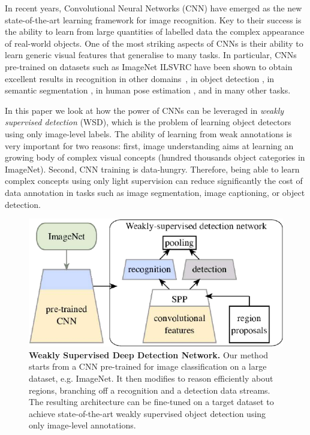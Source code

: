 In recent years, Convolutional Neural Networks (CNN) \cite{Lecun89} have emerged as the new state-of-the-art learning framework for image recognition. Key to their success is the ability to learn from large quantities of labelled data the complex appearance of real-world objects. One of the most striking aspects of CNNs is their ability to learn generic visual features that generalise to many tasks. In particular, CNNs pre-trained on datasets such as ImageNet ILSVRC have been shown to obtain excellent results in recognition in other domains~\cite{Donahue13}, in object detection \cite{Girshick14}, in semantic segmentation \cite{Hariharan14}, in human pose estimation \cite{Toshev13}, and in many other tasks.

In this paper we look at how the power of CNNs can be leveraged in  \emph{weakly supervised detection} (WSD), which is the problem of learning object detectors using only image-level labels. The ability of learning from weak annotations is very important for two reasons: first, image understanding aims at learning an growing body of complex visual concepts (\eg hundred thousands object categories in ImageNet). Second, CNN training is data-hungry. Therefore, being able to learn complex concepts using only light supervision can reduce significantly the cost of data annotation in tasks such as image segmentation, image captioning, or object detection.

\begin{figure}
\begin{center}
\includegraphics[width=\columnwidth]{splash} 
\end{center}
\caption{{\bf Weakly Supervised Deep Detection Network.} Our method starts from a CNN pre-trained for image classification on a large dataset, e.g. ImageNet. It then modifies to reason efficiently about regions, branching off a recognition and a detection data streams. The resulting architecture can be fine-tuned on a target dataset to achieve state-of-the-art weakly supervised object detection using only image-level annotations.}
\label{f:splash}
\end{figure}

